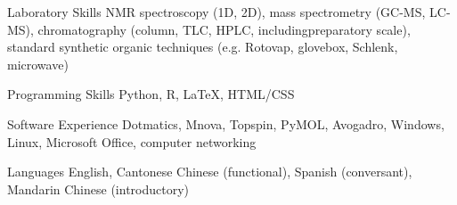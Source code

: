

\begin{cvskills}

  \cvskill
    {Laboratory Skills} %
    {NMR spectroscopy (1D, 2D), mass spectrometry (GC-MS, LC-MS), chromatography (column, TLC, HPLC, including\newline preparatory scale), standard synthetic organic techniques (e.g. Rotovap, glovebox, Schlenk, microwave)} %

  \cvskill
    {Programming Skills} %
    {Python, R, {\selectfont \LaTeX}, HTML/CSS}%

	\cvskill
	{Software Experience} %
	{Dotmatics, Mnova, Topspin, PyMOL, Avogadro, Windows, Linux, Microsoft Office, computer networking}%

  \cvskill
    {Languages} %
    {English, Cantonese Chinese (functional), Spanish (conversant), Mandarin Chinese (introductory)} %

\end{cvskills}
